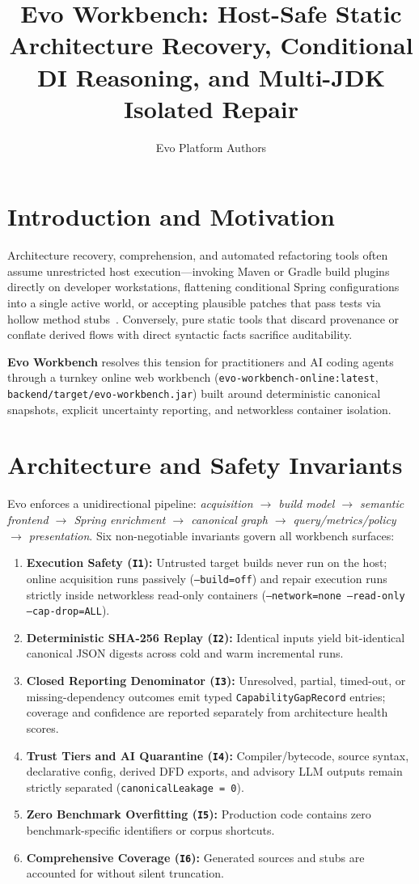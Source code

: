 \documentclass[sigconf,nonacm]{acmart}
\title{Evo Workbench: Host-Safe Static Architecture Recovery, Conditional DI Reasoning, and Multi-JDK Isolated Repair}
\author{Evo Platform Authors}
\affiliation{%
  \institution{University of Information Technology (VNU-HCM)}
  \city{Ho Chi Minh City}
  \country{Vietnam}
}
\begin{document}
\maketitle

\section{Introduction and Motivation}
Architecture recovery, comprehension, and automated refactoring tools often assume unrestricted host execution—invoking Maven or Gradle build plugins directly on developer workstations, flattening conditional Spring configurations into a single active world, or accepting plausible patches that pass tests via hollow method stubs~\cite{swerefactor2026}. Conversely, pure static tools that discard provenance or conflate derived flows with direct syntactic facts sacrifice auditability.

\textbf{Evo Workbench} resolves this tension for practitioners and AI coding agents through a turnkey online web workbench (\texttt{evo-workbench-online:latest}, \texttt{backend/target/evo-workbench.jar}) built around deterministic canonical snapshots, explicit uncertainty reporting, and networkless container isolation.

\section{Architecture and Safety Invariants}
Evo enforces a unidirectional pipeline: \textit{acquisition $\rightarrow$ build model $\rightarrow$ semantic frontend $\rightarrow$ Spring enrichment $\rightarrow$ canonical graph $\rightarrow$ query/metrics/policy $\rightarrow$ presentation}. Six non-negotiable invariants govern all workbench surfaces:
\begin{enumerate}
  \item \textbf{Execution Safety (\texttt{I1}):} Untrusted target builds never run on the host; online acquisition runs passively (\texttt{--build=off}) and repair execution runs strictly inside networkless read-only containers (\texttt{--network=none --read-only --cap-drop=ALL}).
  \item \textbf{Deterministic SHA-256 Replay (\texttt{I2}):} Identical inputs yield bit-identical canonical JSON digests across cold and warm incremental runs.
  \item \textbf{Closed Reporting Denominator (\texttt{I3}):} Unresolved, partial, timed-out, or missing-dependency outcomes emit typed \texttt{CapabilityGapRecord} entries; coverage and confidence are reported separately from architecture health scores.
  \item \textbf{Trust Tiers and AI Quarantine (\texttt{I4}):} Compiler/bytecode, source syntax, declarative config, derived DFD exports, and advisory LLM outputs remain strictly separated (\texttt{canonicalLeakage = 0}).
  \item \textbf{Zero Benchmark Overfitting (\texttt{I5}):} Production code contains zero benchmark-specific identifiers or corpus shortcuts.
  \item \textbf{Comprehensive Coverage (\texttt{I6}):} Generated sources and stubs are accounted for without silent truncation.
\end{enumerate}
\end{document}

